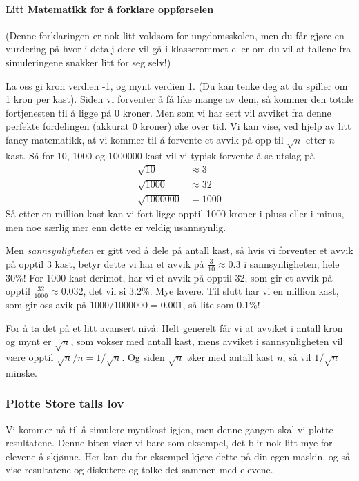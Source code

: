 \documentclass[11pt]{article}
\begin{document}
    \paragraph{Litt Matematikk for å forklare
oppførselen}\label{litt-matematikk-for-uxe5-forklare-oppfuxf8rselen}

(Denne forklaringen er nok litt voldsom for ungdomsskolen, men du får
gjøre en vurdering på hvor i detalj dere vil gå i klasserommet eller om
du vil at tallene fra simuleringene snakker litt for seg selv!)

La oss gi kron verdien -1, og mynt verdien 1. (Du kan tenke deg at du
spiller om 1 kron per kast). Siden vi forventer å få like mange av dem,
så kommer den totale fortjenesten til å ligge på 0 kroner. Men som vi
har sett vil avviket fra denne perfekte fordelingen (akkurat 0 kroner)
øke over tid. Vi kan vise, ved hjelp av litt fancy matematikk, at vi
kommer til å forvente et avvik på opp til \(\sqrt{n}\) etter \(n\) kast.
Så for 10, 1000 og 1000000 kast vil vi typisk forvente å se utslag på
\[\begin{align*}
\sqrt{10} &\approx 3 \\
\sqrt{1000} &\approx 32 \\
\sqrt{1000000} &= 1000
\end{align*}
\] Så etter en million kast kan vi fort ligge opptil 1000 kroner i pluss
eller i minus, men noe særlig mer enn dette er veldig usannsynlig.

Men \emph{sannsynligheten} er gitt ved å dele på antall kast, så hvis vi
forventer et avvik på opptil 3 kast, betyr dette vi har et avvik på
\(\frac{3}{10} \approx 0.3\) i sannsynligheten, hele 30\%! For 1000 kast
derimot, har vi et avvik på opptil 32, som gir et avvik på opptil
\(\frac{32}{1000} \approx 0.032\), det vil si 3.2\%. Mye lavere. Til
slutt har vi en million kast, som gir oss avik på
\(1000/1000000 = 0.001\), så lite som 0.1\%!

For å ta det på et litt avansert nivå: Helt generelt får vi at avviket i
antall kron og mynt er \(\sqrt{n}\), som vokser med antall kast, mens
avviket i sannsynligheten vil være opptil \(\sqrt{n}/n = 1/\sqrt{n}\).
Og siden \(\sqrt{n}\) øker med antall kast \(n\), så vil \(1/\sqrt{n}\)
minske.

    \subsubsection{Plotte Store talls lov}\label{plotte-store-talls-lov}

Vi kommer nå til å simulere myntkast igjen, men denne gangen skal vi
plotte resultatene. Denne biten viser vi bare som eksempel, det blir nok
litt mye for elevene å skjønne. Her kan du for eksempel kjøre dette på
din egen maskin, og så vise resultatene og diskutere og tolke det sammen
med elevene.
\end{document}
